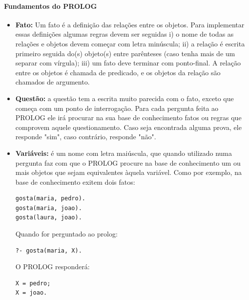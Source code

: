 \paragraph{Fundamentos do PROLOG}
\begin{itemize}
\item \textbf{Fato:} Um fato é a definição das relações entre os objetos. Para implementar essas definições algumas regras devem ser seguidas i) o nome de todas as relações e objetos devem começar com letra minúscula; ii) a relação é escrita primeiro seguida do(s) objeto(s) entre parênteses (caso tenha mais de um separar com vírgula); iii) um fato deve terminar com ponto-final. A relação entre os objetos é chamada de predicado, e os objetos da relação são chamados de argumento.
\item \textbf{Questão:} a questão tem a escrita muito parecida com o fato, exceto que começa com um ponto de interrogação. Para cada pergunta feita ao PROLOG ele irá procurar na sua base de conhecimento fatos ou regras que comprovem aquele questionamento. Caso seja encontrada alguma prova, ele responde "sim", caso contrário, responde "não".
\item \textbf{Variáveis:} é um nome com letra maiúscula, que quando utilizado numa pergunta faz com que o PROLOG procure na base de conhecimento um ou mais objetos que sejam equivalentes àquela variável. Como por exemplo, na base de conhecimento exitem dois fatos: 

\lstset{language=Prolog}
\begin{lstlisting}
gosta(maria, pedro).
gosta(maria, joao). 
gosta(laura, joao).
\end{lstlisting}

Quando for perguntado ao prolog:
\lstset{language=Prolog}
\begin{lstlisting}
?- gosta(maria, X).
\end{lstlisting}

O PROLOG responderá:
\lstset{language=Prolog}
\begin{lstlisting}
X = pedro;
X = joao.
\end{lstlisting}


\end{itemize}
